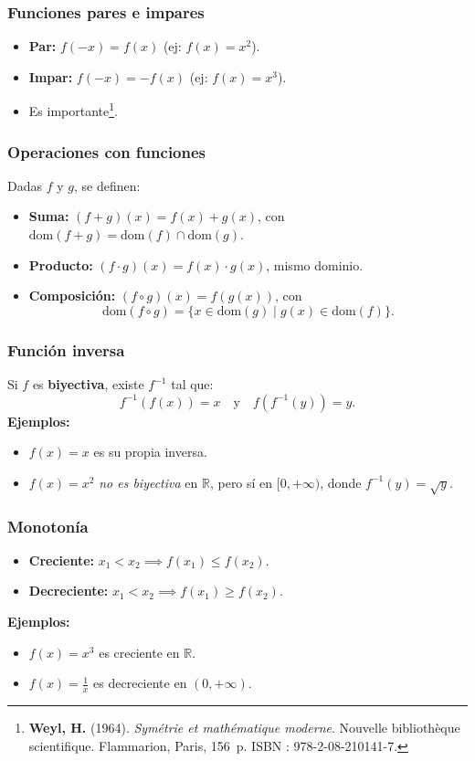 \documentclass[12pt, a4paper]{article}
\theoremstyle{rioplatense}
\newcommand{\R}{\mathbb{R}}
\newcommand{\dom}{\text{dom}}
\begin{document}
\subsubsection{Funciones pares e impares}
\begin{itemize}
    \item \textbf{Par:} \( f(-x) = f(x) \) (ej: \( f(x) = x^2 \)).
    \item \textbf{Impar:} \( f(-x) = -f(x) \) (ej: \( f(x) = x^3 \)).
\item Es importante\footnote{\textbf{Weyl, H.} (1964).
\emph{Symétrie et mathématique moderne}.
Nouvelle bibliothèque scientifique.
Flammarion, Paris, 156~p.
ISBN : 978-2-08-210141-7.}.
\end{itemize}

\subsubsection{Operaciones con funciones}
Dadas \( f \) y \( g \), se definen:
\begin{itemize}
    \item \textbf{Suma:} \( (f + g)(x) = f(x) + g(x) \), con \( \dom(f + g) = \dom(f) \cap \dom(g) \).
    \item \textbf{Producto:} \( (f \cdot g)(x) = f(x) \cdot g(x) \), mismo dominio.
    \item \textbf{Composición:} \( (f \circ g)(x) = f(g(x)) \), con \[ \dom(f \circ g) = \{x \in \dom(g) \mid g(x) \in \dom(f)\}. \]
\end{itemize}

\subsubsection{Función inversa}
Si \( f \) es \textbf{biyectiva}, existe \( f^{-1} \) tal que:
\[
f^{-1}(f(x)) = x \quad \text{y} \quad f(f^{-1}(y)) = y.
\]
\textbf{Ejemplos:}
\begin{itemize}
    \item \( f(x) = x \) es su propia inversa.
    \item \( f(x) = x^2 \) \textit{no es biyectiva} en \( \R \), pero sí en \( [0, +\infty) \), donde \( f^{-1}(y) = \sqrt{y} \).
\end{itemize}

\subsubsection{Monotonía}
\begin{itemize}
    \item \textbf{Creciente:} \( x_1 < x_2 \implies f(x_1) \leq f(x_2) \).
    \item \textbf{Decreciente:} \( x_1 < x_2 \implies f(x_1) \geq f(x_2) \).
\end{itemize}
\textbf{Ejemplos:}
\begin{itemize}
    \item \( f(x) = x^3 \) es creciente en \( \R \).
    \item \( f(x) = \displaystyle \frac{1}{x} \) es decreciente en \( (0, +\infty) \).
\end{itemize}
\end{document}
